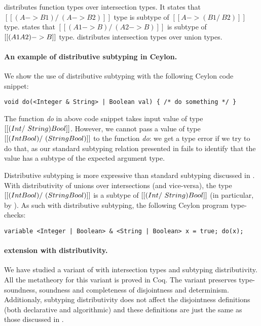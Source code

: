  distributes function types over intersection types.
It states that $[[(A -> B1) /\ (A -> B2)]]$ type is subtype of
$[[A -> (B1 /\ B2)]]$ type.
 states that $[[(A1 -> B) /\ (A2 -> B)]]$ is subtype of
$[[(A1 \/ A2) -> B]]$ type.
 distributes intersection types over union types.

\paragraph{An example of distributive subtyping in Ceylon.}
We show the use of distributive subtyping with the following Ceylon code snippet:

\begin{lstlisting}
void do(<Integer & String> | Boolean val) { /* do something */ }
\end{lstlisting}

\noindent
The function \emph{do} in above code snippet takes input value of type $[[(Int
/\ String) \/ Bool]]$. However, we cannot pass a value of type $[[(Int \/ Bool)
/\ (String \/ Bool)]]$ to the function \emph{do}: we get a type error if we try
to do that, as our standard subtyping relation presented in
 fails to identify that the value has a subtype of the
expected argument type.

Distributive subtyping is more expressive than standard subtyping discussed in
. With distributivity of unions over intersections
(and vice-versa), the type $[[(Int \/ Bool) /\ (String \/ Bool)]]$ is a subtype
of $[[(Int /\ String) \/ Bool]]$ (in particular, by ). As such
with distributive subtyping, the following Ceylon program type-checks:

\begin{lstlisting}
variable <Integer | Boolean> & <String | Boolean> x = true; do(x);
\end{lstlisting}


\paragraph{\name extension with distributivity.}
We have studied a variant of \name with intersection types and subtyping distributivity.
All the metatheory for this variant is proved in Coq. The variant preserves
type-soundness, soundness and completeness of disjointness and determinism.
Additionaly, subtyping distributivity
does not affect the disjointness definitions (both declarative and algorithmic)
and these definitions are just the same as those discussed in .


